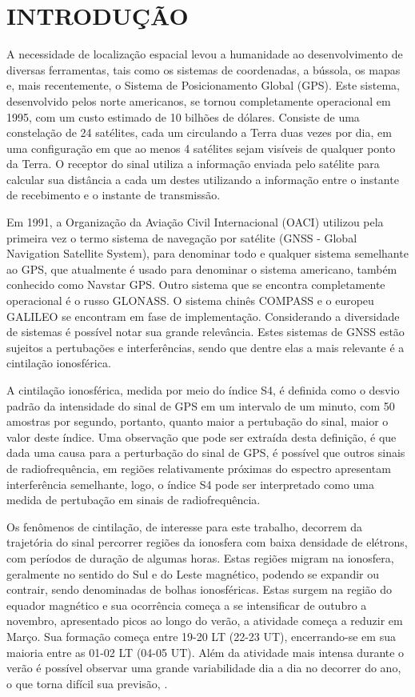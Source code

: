 \chapter{INTRODUÇÃO}

A necessidade de localização espacial levou a humanidade ao desenvolvimento de diversas ferramentas, tais como os sistemas de coordenadas, a bússola, os mapas e, mais recentemente, o Sistema de Posicionamento Global (GPS). Este sistema, desenvolvido pelos norte americanos, se tornou completamente operacional em 1995, com um custo estimado de 10 bilhões de dólares. Consiste de uma constelação de 24 satélites, cada um circulando a Terra duas vezes por dia, em uma configuração em que ao menos 4 satélites sejam visíveis de qualquer ponto da Terra. O receptor do sinal utiliza a informação enviada pelo satélite para calcular sua distância a cada um destes utilizando a informação entre o instante de recebimento e o instante de transmissão. 

Em 1991, a Organização da Aviação Civil Internacional (OACI) utilizou pela primeira vez o termo sistema de navegação por satélite (GNSS - Global Navigation Satellite System), para denominar todo e qualquer sistema semelhante ao GPS, que atualmente é usado para denominar o sistema americano, também conhecido como Navstar GPS. Outro sistema que se encontra completamente operacional é o russo GLONASS. O sistema chinês COMPASS e o europeu GALILEO se encontram em fase de implementação. Considerando a diversidade de sistemas é possível notar sua grande relevância. Estes sistemas de GNSS estão sujeitos a pertubações e interferências, sendo que dentre elas a mais relevante é a cintilação ionosférica.

A cintilação ionosférica, medida por meio do índice S4, é definida como o desvio padrão da intensidade do sinal de GPS em um intervalo de um minuto, com 50 amostras por segundo, portanto, quanto maior a pertubação do sinal, maior o valor deste índice. Uma observação que pode ser extraída desta definição, é que dada uma causa para a perturbação do sinal de GPS, é possível que outros sinais de radiofrequência, em regiões relativamente próximas do espectro apresentam interferência semelhante, logo, o índice S4 pode ser interpretado como uma medida de pertubação em sinais de radiofrequência.

Os fenômenos de cintilação, de interesse para este trabalho, decorrem da trajetória do sinal percorrer regiões da ionosfera com baixa densidade de elétrons, com períodos de duração de algumas horas. Estas regiões migram na ionosfera, geralmente no sentido do Sul e do Leste magnético, podendo se expandir ou contrair, sendo denominadas de bolhas ionosféricas. Estas surgem na região do equador magnético e sua ocorrência começa a se intensificar de outubro a novembro, apresentado picos ao longo do verão, a atividade começa a reduzir em Março. Sua formação começa entre 19-20 LT (22-23 UT), encerrando-se em sua maioria entre as 01-02 LT (04-05 UT). Além da atividade mais intensa durante o verão é possível observar uma grande variabilidade dia a dia no decorrer do ano, o que torna difícil sua previsão, \cite{TAKAHASHI:2006}.

